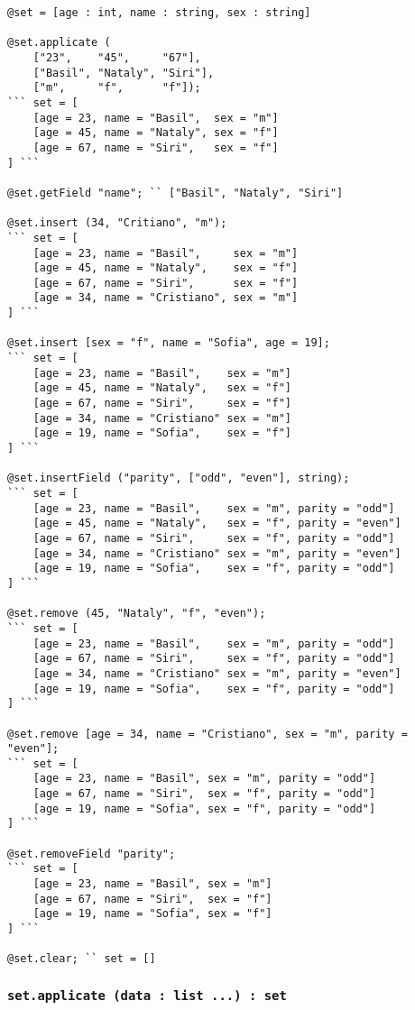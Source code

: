 \begin{lstlisting}[caption=Metodele clasei set, label=setmethods]
@set = [age : int, name : string, sex : string]

@set.applicate (
	["23",    "45",     "67"],
	["Basil", "Nataly", "Siri"],
	["m",     "f",      "f"]);
``` set = [
	[age = 23, name = "Basil",  sex = "m"]
	[age = 45, name = "Nataly", sex = "f"]
	[age = 67, name = "Siri",   sex = "f"]
] ```

@set.getField "name"; `` ["Basil", "Nataly", "Siri"]

@set.insert (34, "Critiano", "m");
``` set = [
	[age = 23, name = "Basil",     sex = "m"]
	[age = 45, name = "Nataly",    sex = "f"]
	[age = 67, name = "Siri",      sex = "f"]
	[age = 34, name = "Cristiano", sex = "m"]
] ```

@set.insert [sex = "f", name = "Sofia", age = 19];
``` set = [
	[age = 23, name = "Basil",    sex = "m"]
	[age = 45, name = "Nataly",   sex = "f"]
	[age = 67, name = "Siri",     sex = "f"]
	[age = 34, name = "Cristiano" sex = "m"]
	[age = 19, name = "Sofia",    sex = "f"]
] ```

@set.insertField ("parity", ["odd", "even"], string);
``` set = [
	[age = 23, name = "Basil",    sex = "m", parity = "odd"]
	[age = 45, name = "Nataly",   sex = "f", parity = "even"]
	[age = 67, name = "Siri",     sex = "f", parity = "odd"]
	[age = 34, name = "Cristiano" sex = "m", parity = "even"]
	[age = 19, name = "Sofia",    sex = "f", parity = "odd"]
] ```

@set.remove (45, "Nataly", "f", "even");
``` set = [
	[age = 23, name = "Basil",    sex = "m", parity = "odd"]
	[age = 67, name = "Siri",     sex = "f", parity = "odd"]
	[age = 34, name = "Cristiano" sex = "m", parity = "even"]
	[age = 19, name = "Sofia",    sex = "f", parity = "odd"]
] ```

@set.remove [age = 34, name = "Cristiano", sex = "m", parity = "even"];
``` set = [
	[age = 23, name = "Basil", sex = "m", parity = "odd"]
	[age = 67, name = "Siri",  sex = "f", parity = "odd"]
	[age = 19, name = "Sofia", sex = "f", parity = "odd"]
] ```

@set.removeField "parity";
``` set = [
	[age = 23, name = "Basil", sex = "m"]
	[age = 67, name = "Siri",  sex = "f"]
	[age = 19, name = "Sofia", sex = "f"]
] ```

@set.clear; `` set = []
\end{lstlisting}

\subsubsection{\lstinline|set.applicate (data : list ...) : set|}

